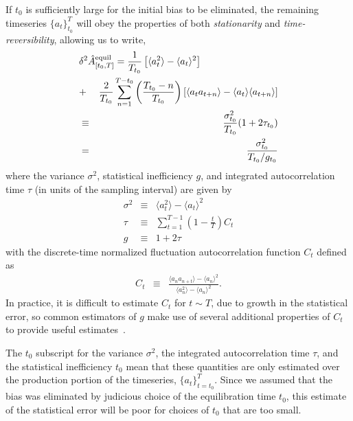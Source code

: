 \documentclass[aps,pre,twocolumn,nofootinbib,superscriptaddress,linenumbers,11point]{revtex4-1}
\newcommand{\expect}[1]{\langle #1 \rangle}                %
\begin{document}
If $t_0$ is sufficiently large for the initial bias to be eliminated, the remaining timeseries $\{a_t\}_{t_0}^T$ will obey the properties of both \emph{stationarity} and \emph{time-reversibility}, allowing us to write,
\begin{eqnarray}
\lefteqn{\delta^2 \hat{A}_{[t_0,T]}^\mathrm{equil} = \frac{1}{T_{t_0}} \left[ \expect{a_t^2} - \expect{a_t}^2 \right]} \nonumber \\
\mbox{} &+& \frac{2}{T_{t_0}} \sum_{n=1}^{T-t_0} \left(\frac{T_{t_0}-n}{T_{t_0}}\right) \left[ \expect{a_t a_{t+n}} - \expect{a_t}\expect{a_{t+n}} \right]  \nonumber \\
&\equiv& \frac{\sigma_{t_0}^2}{T_{t_0}}(1 + 2 \tau_{t_0}) \nonumber \\
&=& \frac{\sigma_{t_0}^2}{T_{t_0}/g_{t_0}}
\end{eqnarray}
where the variance $\sigma^2$, statistical inefficiency $g$, and integrated autocorrelation time $\tau$ (in units of the sampling interval) are given by
\begin{eqnarray}
\sigma^2 &\equiv& \expect{a_t^2} - \expect{a_t}^2 \label{equation:variance-definition} \\
\tau &\equiv& \sum_{t=1}^{T-1} \left(1 - \frac{t}{T}\right) C_t \label{equation:integrated-autocorrelation-time-definition} \\
g &\equiv& 1 + 2 \tau \label{equation:statistical-inefficiency-definition}
\end{eqnarray}
with the discrete-time normalized fluctuation autocorrelation function $C_t$ defined as
\begin{eqnarray}
C_t &\equiv& \frac{\expect{a_n a_{n+t}} - \expect{a_n}^2}{\expect{a_n^2} - \expect{a_n}^2} . \label{equation:autocorrelation-definition}
\end{eqnarray}
In practice, it is difficult to estimate $C_t$ for $t \sim T$, due to growth in the statistical error, so common estimators of $g$ make use of several additional properties of $C_t$ to provide useful estimates~\cite{crc-mcmc-handbook}.

The $t_0$ subscript for the variance $\sigma^2$, the integrated autocorrelation time $\tau$, and the statistical inefficiency $t_0$ mean that these quantities are only estimated over the production portion of the timeseries, $\{a_t\}_{t=t_0}^T$.
Since we assumed that the bias was eliminated by judicious choice of the equilibration time $t_0$, this estimate of the statistical error will be poor for choices of $t_0$ that are too small.

\end{document}
